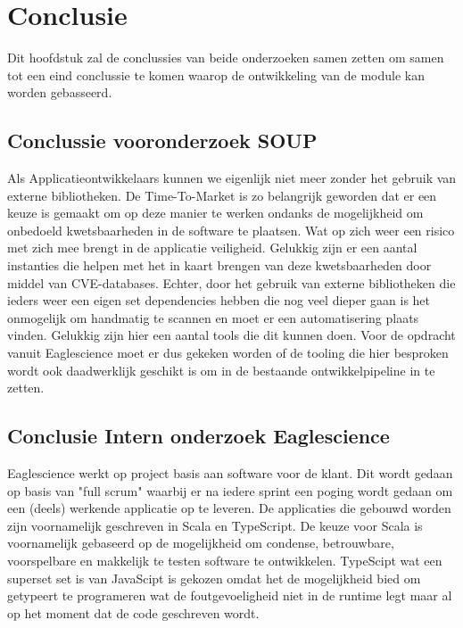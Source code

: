 
\chapter{Conclusie}\label{ch:conclusie} %


Dit hoofdstuk zal de conclussies van beide onderzoeken samen zetten om samen tot een eind conclussie te komen waarop de ontwikkeling van de module kan worden gebasseerd.


\section{Conclussie vooronderzoek SOUP}\label{sec:conclussie-vooronderzoek-soup}
Als Applicatieontwikkelaars kunnen we eigenlijk niet meer zonder het gebruik van externe bibliotheken.
De Time-To-Market is zo belangrijk geworden dat er een keuze is gemaakt om op deze manier te werken ondanks de mogelijkheid om onbedoeld kwetsbaarheden in de software te plaatsen.
Wat op zich weer een risico met zich mee brengt in de applicatie veiligheid.
Gelukkig zijn er een aantal instanties die helpen met het in kaart brengen van deze kwetsbaarheden door middel van CVE-databases.
Echter, door het gebruik van externe bibliotheken die ieders weer een eigen set dependencies hebben die nog veel dieper gaan is het onmogelijk om handmatig te scannen en moet er een automatisering plaats vinden.
Gelukkig zijn hier een aantal tools die dit kunnen doen.
Voor de opdracht vanuit Eaglescience moet er dus gekeken worden of de tooling die hier besproken wordt ook daadwerklijk geschikt is om in de bestaande ontwikkelpipeline in te zetten.


\section{Conclusie Intern onderzoek Eaglescience}
Eaglescience werkt op project basis aan software voor de klant. Dit wordt gedaan op basis van "full scrum" waarbij er na iedere sprint een poging wordt gedaan om een (deels) werkende applicatie op te leveren. De applicaties die gebouwd worden zijn voornamelijk geschreven in Scala en TypeScript. De keuze voor Scala is voornamelijk gebaseerd op de mogelijkheid om condense, betrouwbare, voorspelbare en makkelijk te testen software te ontwikkelen. TypeScipt wat een superset set is van JavaScipt is gekozen omdat het de mogelijkheid bied om getypeert te programeren wat de foutgevoeligheid niet in de runtime legt maar al op het moment dat de code geschreven wordt.

